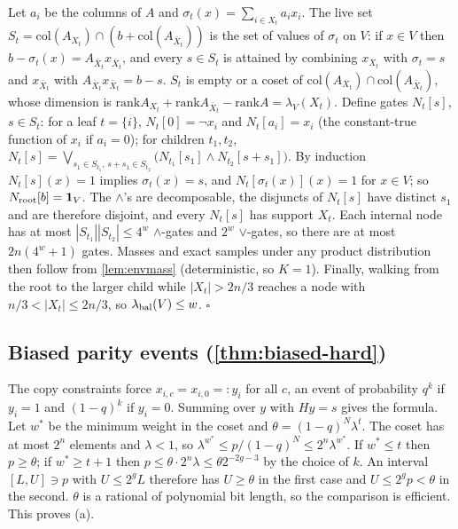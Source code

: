 Let $a_i$ be the columns of $A$ and $\sigma_t(x)=\sum_{i\in X_t}a_ix_i$. The live set
$S_t=\mathrm{col}(A_{X_t})\cap(b+\mathrm{col}(A_{\bar X_t}))$ is the set of values of
$\sigma_t$ on $V$: if $x\in V$ then $b-\sigma_t(x)=A_{\bar X_t}x_{\bar X_t}$, and every
$s\in S_t$ is attained by combining $x_{X_t}$ with $\sigma_t=s$ and $x_{\bar X_t}$
with $A_{\bar X_t}x_{\bar X_t}=b-s$. $S_t$ is empty or a coset of
$\mathrm{col}(A_{X_t})\cap\mathrm{col}(A_{\bar X_t})$, whose dimension is
$\mathrm{rank}A_{X_t}+\mathrm{rank}A_{\bar X_t}-\mathrm{rank}A=\lambda_V(X_t)$. Define
gates $N_t[s]$, $s\in S_t$: for a leaf $t=\{i\}$, $N_t[0]=\neg x_i$ and $N_t[a_i]=x_i$
(the constant-true function of $x_i$ if $a_i=0$); for children $t_1,t_2$,
$N_t[s]=\bigvee_{s_1\in S_{t_1},\,s+s_1\in S_{t_2}}\big(N_{t_1}[s_1]\wedge
N_{t_2}[s+s_1]\big)$. By induction $N_t[s](x)=1$ implies $\sigma_t(x)=s$, and
$N_t[\sigma_t(x)](x)=1$ for $x\in V$; so $N_{\rm root}[b]=\mathbf{1}_V$. The $\wedge$'s are
decomposable, the disjuncts of $N_t[s]$ have distinct $s_1$ and are therefore
disjoint, and every $N_t[s]$ has support $X_t$. Each internal node has at most
$|S_{t_1}||S_{t_2}|\le4^w$ $\wedge$-gates and $2^w$ $\vee$-gates, so there are at most
$2n(4^w+1)$ gates. Masses and exact samples under any product distribution then follow
from \cref{lem:envmass} (deterministic, so $K=1$). Finally, walking from the root to
the larger child while $|X_t|>2n/3$ reaches a node with $n/3<|X_t|\le2n/3$, so
$\lambda_{\rm bal}(V)\le w$.
\hfill$\square$

\subsection{Biased parity events (\cref{thm:biased-hard})}

The copy constraints force $x_{i,c}=x_{i,0}=:y_i$ for all $c$, an event of probability
$q^{k}$ if $y_i=1$ and $(1-q)^k$ if $y_i=0$. Summing over $y$ with $Hy=s$ gives the
formula. Let $w^*$ be the minimum weight in the coset and
$\theta=(1-q)^N\lambda^t$. The coset has at most $2^n$ elements and $\lambda<1$, so
$\lambda^{w^*}\le p/(1-q)^N\le2^n\lambda^{w^*}$. If $w^*\le t$ then $p\ge\theta$; if
$w^*\ge t+1$ then $p\le\theta\cdot2^n\lambda\le\theta2^{-2g-3}$ by the choice of $k$.
An interval $[L,U]\ni p$ with $U\le2^gL$ therefore has $U\ge\theta$ in the first case and
$U\le2^gp<\theta$ in the second. $\theta$ is a rational of polynomial bit length, so
the comparison is efficient. This proves (a).

